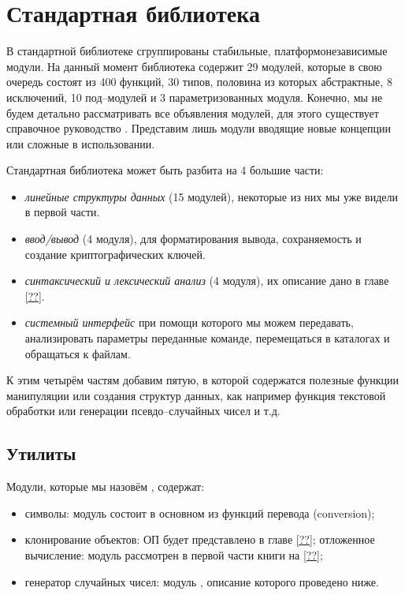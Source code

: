 \section{Стандартная библиотека}
\label{sec:standard_library}

В стандартной библиотеке сгруппированы стабильные, платформонезависимые модули. 
На данный момент библиотека содержит 29 модулей, которые в свою очередь состоят 
из 400 функций, 30 типов, половина из которых абстрактные, 8 исключений, 10 
под–модулей и 3 параметризованных модуля. Конечно, мы не будем детально 
рассматривать все объявления модулей, для этого существует справочное 
руководство \cite{??}. Представим лишь модули вводящие новые концепции или 
сложные в использовании.

Стандартная библиотека может быть разбита на 4 большие части:

\begin{itemize}
	\item {\it линейные структуры данных} (15 модулей), некоторые из них мы уже 
видели в первой части.

	\item {\it ввод/вывод} (4 модуля), для форматирования вывода, сохраняемость 
и создание криптографических ключей.

	\item {\it синтаксический и лексический анализ} (4 модуля), их описание 
дано в главе \ref{??}.

	\item {\it системный интерфейс} при помощи которого мы можем передавать, 
анализировать параметры переданные команде, перемещаться в каталогах и 
обращаться к файлам.
\end{itemize}

К этим четырём частям добавим пятую, в которой содержатся полезные функции 
манипуляции или создания структур данных, как например функция текстовой 
обработки или генерации псевдо--случайных чисел и т.д.

\subsection{Утилиты}
\label{subsec:utilities}

Модули, которые мы назовём , содержат:

\begin{itemize}
	\item символы: модуль  состоит в основном из функций перевода 
(conversion);

	\item клонирование объектов: ОП будет представлено в главе \ref{??}; 
отложенное вычисление: модуль  рассмотрен в первой части книги на 
\ref{??};

	\item генератор случайных чисел: модуль , описание которого 
проведено ниже.
\end{itemize}

